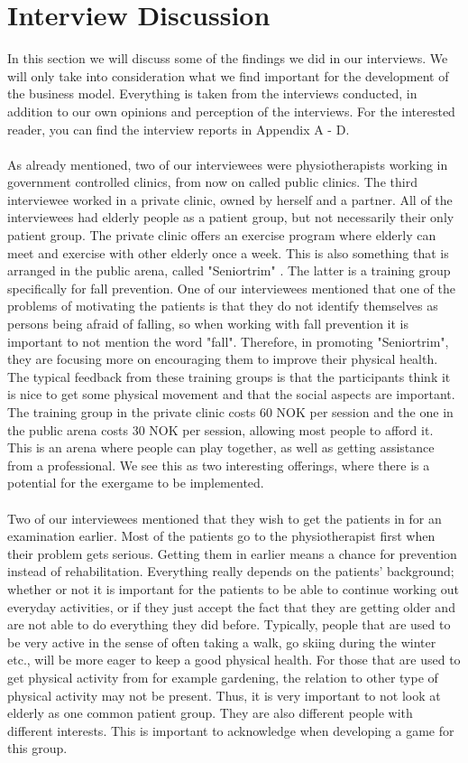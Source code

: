 \chapter{Interview Discussion}
In this section we will discuss some of the findings we did in our interviews. We will only take into consideration what we find important for the development of the business model. Everything is taken from the interviews conducted, in addition to our own opinions and perception of the interviews. For the interested reader, you can find the interview reports in Appendix A - D.\\ \\
As already mentioned, two of our interviewees were physiotherapists working in government controlled clinics, from now on called public clinics. The third interviewee worked in a private clinic, owned by herself and a partner. All of the interviewees had elderly people as a patient group, but not necessarily their only patient group. The private clinic offers an exercise program where elderly can meet and exercise with other elderly once a week. This is also something that is arranged in the public arena, called "Seniortrim" \cite{trim}. The latter is a training group specifically for fall prevention. One of our interviewees mentioned that one of the problems of motivating the patients is that they do not identify themselves as  persons being afraid of falling, so when working with fall prevention it is important to not mention the word "fall". Therefore, in promoting "Seniortrim", they are focusing more on encouraging them to improve their physical health. The typical feedback from these training groups is that the participants think it is nice to get some physical movement and that the social aspects are important. The training group in the private clinic costs 60 NOK per session and the one in the public arena costs 30 NOK per session, allowing most people to afford it. This is an arena where people can play together, as well as getting assistance from a professional. We see this as two interesting offerings, where there is a potential for the exergame to be implemented.  \\ \\
Two of our interviewees mentioned that they wish to get the patients in for an examination earlier. Most of the patients go to the physiotherapist first when their problem gets serious. Getting them in earlier means a chance for prevention instead of rehabilitation. Everything really depends on the patients' background; whether or not it is important for the patients to be able to continue working out everyday activities, or if they just accept the fact that they are getting older and are not able to do everything they did before. Typically, people that are used to be very active in the sense of often taking a walk, go skiing during the winter etc., will be more eager to keep a good physical health. For those that are used to get physical activity from for example gardening, the relation to other type of physical activity may not be present. Thus, it is very important to not look at elderly as one common patient group. They are also different people with different interests. This is important to acknowledge when developing a game for this group.\\ \\
